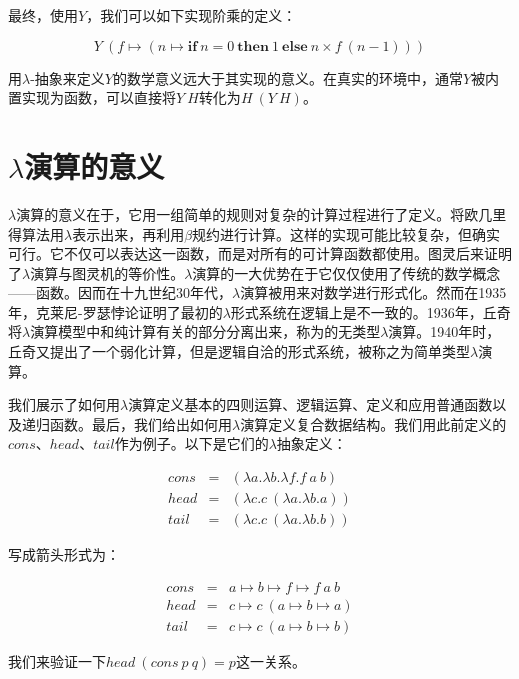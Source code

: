 \documentclass{article}
\begin{document}
最终，使用$Y$，我们可以如下实现阶乘的定义：

\[
Y\ (f \mapsto (n \mapsto \textbf{if}\ n = 0\ \textbf{then}\ 1\ \textbf{else}\ n \times f\ (n - 1)))
\]

用$\lambda$-抽象来定义$Y$的数学意义远大于其实现的意义。在真实的环境中，通常$Y$被内置实现为函数，可以直接将$Y\ H$转化为$H\ (Y\ H)$。

\section{$\lambda$演算的意义}

$\lambda$演算的意义在于，它用一组简单的规则对复杂的计算过程进行了定义。将欧几里得算法用$\lambda$表示出来，再利用$\beta$规约进行计算。这样的实现可能比较复杂，但确实可行。它不仅可以表达这一函数，而是对所有的可计算函数都使用。图灵后来证明了$\lambda$演算与图灵机的等价性。$\lambda$演算的一大优势在于它仅仅使用了传统的数学概念——函数。因而在十九世纪30年代，$\lambda$演算被用来对数学进行形式化。然而在1935年，克莱尼-罗瑟悖论证明了最初的$\lambda$形式系统在逻辑上是不一致的。1936年，丘奇将$\lambda$演算模型中和纯计算有关的部分分离出来，称为的无类型$\lambda$演算。1940年时，丘奇又提出了一个弱化计算，但是逻辑自洽的形式系统，被称之为简单类型$\lambda$演算。

我们展示了如何用$\lambda$演算定义基本的四则运算、逻辑运算、定义和应用普通函数以及递归函数。最后，我们给出如何用$\lambda$演算定义复合数据结构。我们用此前定义的$cons$、$head$、$tail$作为例子。以下是它们的$\lambda$抽象定义：

\[
\begin{array}{rcl}
cons & = & (\lambda a . \lambda b . \lambda f . f\ a\ b) \\
head & = & (\lambda c . c\ (\lambda a . \lambda b . a)) \\
tail & = & (\lambda c . c\ (\lambda a . \lambda b . b))
\end{array}
\]

写成箭头形式为：

\[
\begin{array}{rcl}
cons & = & a \mapsto b \mapsto f \mapsto f\ a\ b \\
head & = & c \mapsto c\ (a \mapsto b \mapsto a) \\
tail & = & c \mapsto c\ (a \mapsto b \mapsto b)
\end{array}
\]

我们来验证一下$head\ (cons\ p\ q) = p$这一关系。
\end{document}
